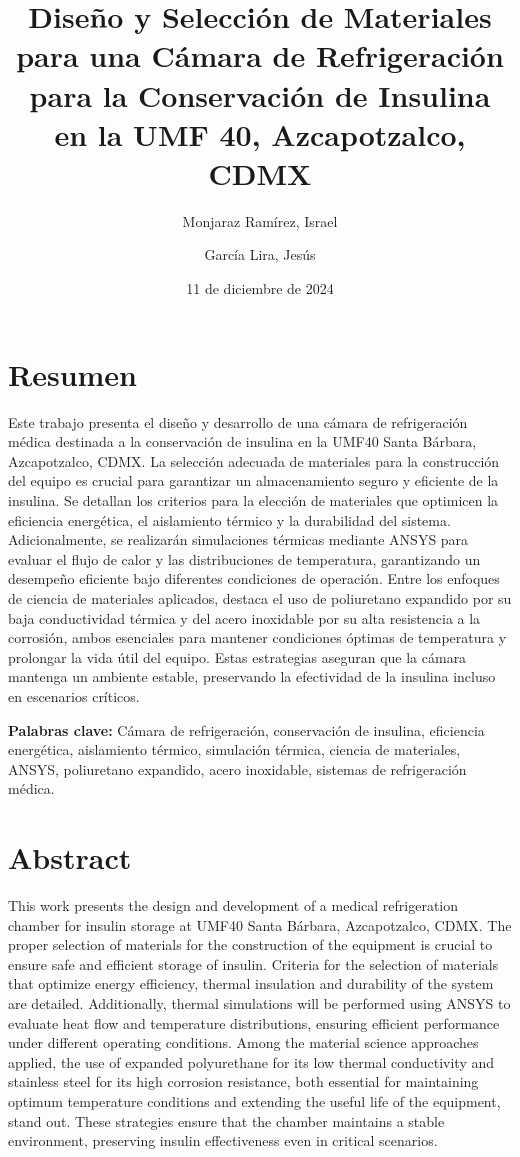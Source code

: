 \documentclass[11pt,a4paper]{article}
\title{Diseño y Selección de Materiales para una Cámara de Refrigeración para la Conservación de Insulina en la UMF 40, Azcapotzalco, CDMX}
\author[1]{Monjaraz Ramírez, Israel}
\affil[1]{Instituto Politécnico Nacional, ESIME Azcapotzalco, CDMX}
\author[2]{García Lira, Jesús}
\affil[2]{Instituto Politécnico Nacional, ESIME Azcapotzalco, Academia de Ciencia de los Materiales, CDMX}
\date{11 de diciembre de 2024}
\begin{document}
\maketitle

\justifying

\section*{Resumen}
Este trabajo presenta el diseño y desarrollo de una cámara de refrigeración médica destinada a la conservación de insulina en la UMF40 Santa Bárbara, Azcapotzalco, CDMX. La selección adecuada de materiales para la construcción del equipo es crucial para garantizar un almacenamiento seguro y eficiente de la insulina. Se detallan los criterios para la elección de materiales que optimicen la eficiencia energética, el aislamiento térmico y la durabilidad del sistema. Adicionalmente, se realizarán simulaciones térmicas mediante ANSYS para evaluar el flujo de calor y las distribuciones de temperatura, garantizando un desempeño eficiente bajo diferentes condiciones de operación. Entre los enfoques de ciencia de materiales aplicados, destaca el uso de poliuretano expandido por su baja conductividad térmica y del acero inoxidable por su alta resistencia a la corrosión, ambos esenciales para mantener condiciones óptimas de temperatura y prolongar la vida útil del equipo. Estas estrategias aseguran que la cámara mantenga un ambiente estable, preservando la efectividad de la insulina incluso en escenarios críticos.


\textbf{Palabras clave:} Cámara de refrigeración, conservación de insulina, eficiencia energética, aislamiento térmico, simulación térmica, ciencia de materiales, ANSYS, poliuretano expandido, acero inoxidable, sistemas de refrigeración médica.


\section*{Abstract}
This work presents the design and development of a medical refrigeration chamber for insulin storage at UMF40 Santa Bárbara, Azcapotzalco, CDMX. The proper selection of materials for the construction of the equipment is crucial to ensure safe and efficient storage of insulin. Criteria for the selection of materials that optimize energy efficiency, thermal insulation and durability of the system are detailed. Additionally, thermal simulations will be performed using ANSYS to evaluate heat flow and temperature distributions, ensuring efficient performance under different operating conditions. Among the material science approaches applied, the use of expanded polyurethane for its low thermal conductivity and stainless steel for its high corrosion resistance, both essential for maintaining optimum temperature conditions and extending the useful life of the equipment, stand out. These strategies ensure that the chamber maintains a stable environment, preserving insulin effectiveness even in critical scenarios.
\end{document}
